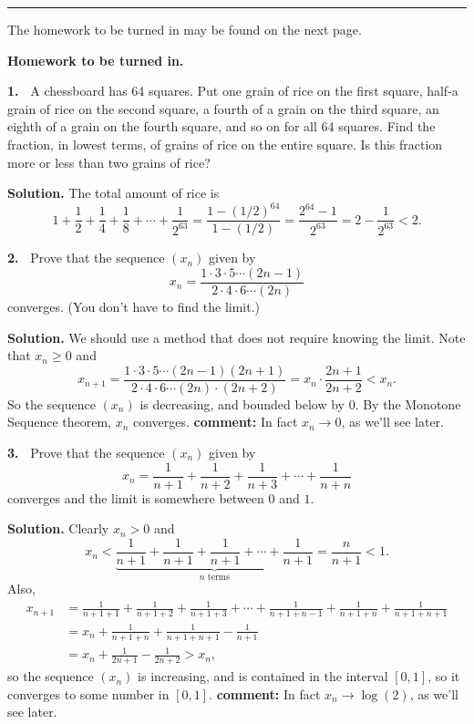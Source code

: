 \documentclass[12pt]{article}
\theoremstyle{definition}
\theoremstyle{remark}
\theoremstyle{definition}
\newenvironment{Solution}{\noindent\textbf{Solution.}}{}
\begin{document}
 \rule{\textwidth}{1pt}
The homework to be turned in may be found on the next page.


\newpage

{\bf Homework to be turned in.}

{\bf 1.\ } A chessboard has 64 squares. Put one grain of rice on the first square, half-a grain of rice on the second square, a fourth of a grain on the third square, an eighth of a grain on the fourth square, and so on for all 64 squares. 
Find the fraction, in lowest terms, of grains of rice on the entire square.  Is this fraction more or less than two grains of rice?

\begin{Solution} 
The total amount of rice is 
\[1+\frac{1}{2}+\frac{1}{4}+\frac{1}{8}+\cdots+\frac{1}{2^{63}}=
\frac{1-(1/2)^{64}}{1-(1/2)}=\frac{2^{64}-1}{2^{63}}=2-\frac{1}{2^{63}}<2.
\]

\end{Solution}

\vskip10pt

{\bf 2.\ } Prove that the sequence $(x_n)$ given by
\[x_n=\frac{1\cdot 3\cdot 5\cdots (2n-1)}{2\cdot 4\cdot 6\cdots (2n)}\]
converges. (You don't have to find the limit.) 

\begin{Solution} We should use a method that does not require knowing the limit. Note that $x_n\geq 0$ and 
\[x_{n+1}=\frac{1\cdot 3\cdot 5\cdots (2n-1)(2n+1)}
{2\cdot 4\cdot 6\cdots (2n)\cdot(2n+2)}=
x_n\cdot \frac{2n+1}{2n+2}<x_n.
\]
So the sequence $(x_n)$ is decreasing, and bounded below by $0$. 
By the Monotone Sequence theorem, $x_n$ converges. 
\end{Solution} 
{\bf comment: } In fact $x_n\to 0$, as we'll see later. 

{\bf 3.\ } Prove that the sequence $(x_n)$ given by
\[x_n=\frac{1}{n+1}+\frac{1}{n+2}+\frac{1}{n+3}+\cdots+\frac{1}{n+n}\]
converges and the limit is somewhere between $0$ and $1$. 


\begin{Solution} Clearly $x_n>0$ and 
\[x_n<\underbrace{\frac{1}{n+1}+\frac{1}{n+1}+\frac{1}{n+1}+\cdots+\frac{1}{n+1}}_{\text{$n$ terms}}=\frac{n}{n+1}<1.
\]
Also, 
\[\begin{split}
x_{n+1}&=\frac{1}{n+1+1}+\frac{1}{n+1+2}+\frac{1}{n+1+3}+\cdots+\frac{1}{n+1+n-1}+\frac{1}{n+1+n}+\frac{1}{n+1+n+1}\\
&=x_n+\frac{1}{n+1+n}+\frac{1}{n+1+n+1}-\frac{1}{n+1}\\
&=x_n+\frac{1}{2n+1}-\frac{1}{2n+2}>x_n,
\end{split}
\]
so the sequence $(x_n)$ is increasing, and is contained in the interval $[0,1]$, so it converges to some number in $[0,1]$. 
\end{Solution} 
{\bf comment: } In fact $x_n\to \log(2)$, as we'll see later. 
\end{document}
